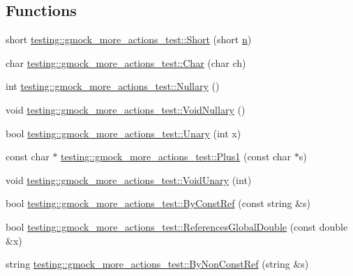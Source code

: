 \subsection*{Functions}
\begin{DoxyCompactItemize}
\item 
short \hyperlink{namespacetesting_1_1gmock__more__actions__test_a00503d3168f1123e314c0d42b7e10b88}{testing\+::gmock\+\_\+more\+\_\+actions\+\_\+test\+::\+Short} (short \hyperlink{app_2main_8cpp_acfc02ec89670db29251fda6a66602ce2}{n})
\item 
char \hyperlink{namespacetesting_1_1gmock__more__actions__test_af69e6906d734a99d60480e4291891d66}{testing\+::gmock\+\_\+more\+\_\+actions\+\_\+test\+::\+Char} (char ch)
\item 
int \hyperlink{namespacetesting_1_1gmock__more__actions__test_acdd2dd80f777fdb770b513b63064ac19}{testing\+::gmock\+\_\+more\+\_\+actions\+\_\+test\+::\+Nullary} ()
\item 
void \hyperlink{namespacetesting_1_1gmock__more__actions__test_a061f6d66383a4e793b4d4ca93bd8ca2f}{testing\+::gmock\+\_\+more\+\_\+actions\+\_\+test\+::\+Void\+Nullary} ()
\item 
bool \hyperlink{namespacetesting_1_1gmock__more__actions__test_aad456ea2ee1b0cb2741b676a34f540a3}{testing\+::gmock\+\_\+more\+\_\+actions\+\_\+test\+::\+Unary} (int x)
\item 
const char $\ast$ \hyperlink{namespacetesting_1_1gmock__more__actions__test_a986ada18d3311d3fa3a7c33e54e18f33}{testing\+::gmock\+\_\+more\+\_\+actions\+\_\+test\+::\+Plus1} (const char $\ast$s)
\item 
void \hyperlink{namespacetesting_1_1gmock__more__actions__test_a163632ef644604032f00334fce36de1a}{testing\+::gmock\+\_\+more\+\_\+actions\+\_\+test\+::\+Void\+Unary} (int)
\item 
bool \hyperlink{namespacetesting_1_1gmock__more__actions__test_ab175725bcdacf7a00948c7d5c1a36419}{testing\+::gmock\+\_\+more\+\_\+actions\+\_\+test\+::\+By\+Const\+Ref} (const string \&s)
\item 
bool \hyperlink{namespacetesting_1_1gmock__more__actions__test_ae2d3dddc96f5657127593f129cd3fc51}{testing\+::gmock\+\_\+more\+\_\+actions\+\_\+test\+::\+References\+Global\+Double} (const double \&x)
\item 
string \hyperlink{namespacetesting_1_1gmock__more__actions__test_ac0099e2d9f40351252df31feda822b71}{testing\+::gmock\+\_\+more\+\_\+actions\+\_\+test\+::\+By\+Non\+Const\+Ref} (string \&s)
\item 

\end{DoxyCompactItemize}
